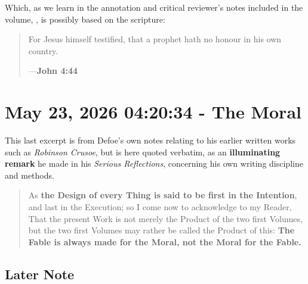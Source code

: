 \documentclass[a4paper]{article}
\begin{document}
Which, as we learn in the annotation and critical reviewer's notes included in the volume, \cite{Defoe2007}, is possibly based on the scripture: 


\noindent
\begin{minipage}{1\textwidth}
\vspace{1em}
\begin{quotation}
{\ttfamily


For Jesus himself testified, that a prophet hath no honour in his own country.


}
\hspace*{\fill} ---\textbf{John 4:44}
\end{quotation}
\vspace{1em}
\end{minipage}






\section{May 23, 2026 04:20:34 - The Moral}
\label{SEC77}



This last excerpt is from Defoe's own notes relating to his earlier written works such as \textit{Robinson Crusoe}, but is here quoted verbatim, as an \textbf{illuminating remark} he made in his \textit{Serious Reflections}, concerning his own writing discipline and methods.



\noindent
\begin{minipage}{1\textwidth}
\vspace{1em}
\begin{quotation}
{\ttfamily


As \textbf{the Design of every Thing is said to be first in the Intention}, and last in the Execution; so I come now to acknowledge to my Reader, That the present Work is not merely the Product of the two first Volumes, but the two first Volumes may rather be called the Product of this: \textbf{The Fable is always made for the Moral, not the Moral for the Fable.}

}
\end{quotation}
\vspace{1em}
\end{minipage}



\subsection{Later Note}
\end{document}
